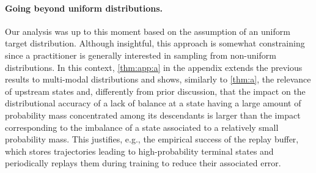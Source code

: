 \documentclass{article}
\theoremstyle{plain}
\theoremstyle{definition}
\theoremstyle{remark}
\theoremstyle{remark}
\begin{document}
\paragraph{Going beyond uniform distributions.} Our analysis was up to this moment based on the assumption of an uniform target distribution. Although insightful, this approach is somewhat constraining since a practitioner is generally interested in sampling from non-uniform distributions. In this context, \autoref{thm:app:a} in the appendix extends the previous results to multi-modal distributions and shows, similarly to \autoref{thm:a}, the relevance of upstream states and, differently from prior discussion, that the impact on the distributional accuracy of a lack of balance at a state having a large amount of probability mass concentrated among its descendants is larger than the impact corresponding to the imbalance of a state associated to a relatively small probability mass. This justifies, e.g., the empirical success of the replay buffer, which stores trajectories leading to high-probability terminal states and periodically replays them during training to reduce their associated error. 

\end{document}

